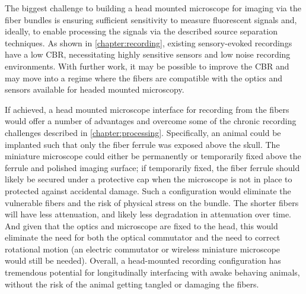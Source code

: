 The biggest challenge to building a head 
mounted microscope for imaging via the fiber 
bundles is ensuring sufficient sensitivity 
to measure fluorescent signals and, ideally,
to enable processing the signals via the described source 
separation techniques. As shown in 
\cref{chapter:recording}, existing 
sensory-evoked recordings have a low 
CBR, necessitating highly sensitive sensors 
and low noise recording environments. With 
further work, it may be possible to improve 
the CBR and may move into a regime where the 
fibers are compatible with the optics and 
sensors available for headed mounted microscopy.

If achieved, a head mounted microscope interface 
for recording from the fibers would offer a number 
of advantages and overcome some of the chronic 
recording challenges described in 
\cref{chapter:processing}. Specifically, an animal 
could be implanted such that only the fiber ferrule 
was exposed above the skull. The miniature 
microscope could either be permanently or temporarily 
fixed above the ferrule and polished imaging surface; 
if temporarily fixed, the fiber ferrule should likely 
be secured under a protective cap when the microscope 
is not in place to protected against accidental 
damage. Such a configuration would eliminate the 
vulnerable fibers and the risk of physical stress on 
the bundle. The shorter fibers will have less 
attenuation, and likely less degradation in attenuation 
over time. And given that the optics and microscope 
are fixed to the head, this would eliminate the need for 
both the optical commutator and the need to correct 
rotational motion (an electric commutator or wireless miniature 
microscope would still be needed). Overall, a head-mounted 
recording configuration has tremendous potential for 
longitudinally interfacing with awake behaving animals, 
without the risk of the animal getting tangled or 
damaging the fibers.

